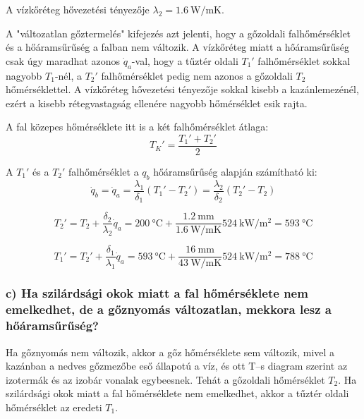 A vízkőréteg hővezetési tényezője $\lambda_2 = \SI{1.6}{\watt\per\meter\kelvin}$.

\vspace{2mm}

A "változatlan gőztermelés" kifejezés azt jelenti, hogy a gőzoldali falhőmérséklet és a hőáramsűrűség a falban nem változik. A vízkőréteg miatt a hőáramsűrűség csak úgy maradhat azonos $\dot{q}_a$-val, hogy a tűztér oldali $T_1'$ falhőmérséklet sokkal nagyobb $T_1$-nél, a $T_2'$ falhőmérséklet pedig nem azonos a gőzoldali $T_2$ hőmérséklettel. A vízkőréteg hővezetési tényezője sokkal kisebb a kazánlemezénél, ezért a kisebb rétegvastagság ellenére nagyobb hőmérséklet esik rajta.

A fal közepes hőmérséklete itt is a két falhőmérséklet átlaga:
\begin{equation}
	T_K' = \frac{T_1' + T_2'}{2}
\end{equation}

A $T_1'$ és a $T_2'$ falhőmérséklet a $q_b$ hőáramsűrűség alapján számítható ki:
\begin{equation}
	\dot{q}_b = \dot{q}_a = \frac{\lambda_1}{\delta_1} (T_1' - T_2') = \frac{\lambda_2}{\delta_2} (T_2' - T_2)
\end{equation}

\begin{equation}
	T_2' = T_2 + \frac{\delta_2}{\lambda_2}\dot{q}_a = \SI{200}{\celsius} + \frac{\SI{1.2}{\milli\meter}}{\SI{1.6}{\watt\per\meter\kelvin}} \SI{524}{\kilo\watt\per\meter\squared} = \SI{593}{\celsius}
\end{equation}

\begin{equation}
	T_1' = T_2' + \frac{\delta_1}{\lambda_1}\dot{q}_a = \SI{593}{\celsius} + \frac{\SI{16}{\milli\meter}}{\SI{43}{\watt\per\meter\kelvin}} \SI{524}{\kilo\watt\per\meter\squared} = \SI{788}{\celsius}
\end{equation}

\subsubsection*{c) Ha szilárdsági okok miatt a fal hőmérséklete nem emelkedhet, de a gőznyomás változatlan, mekkora lesz a hőáramsűrűség?}

Ha gőznyomás nem változik, akkor a gőz hőmérséklete sem változik, mivel a kazánban a nedves gőzmezőbe eső állapotú a víz, és ott T--s diagram szerint az izotermák és az izobár vonalak egybeesnek. Tehát a gőzoldali hőmérséklet $T_2$. Ha szilárdsági okok miatt a fal hőmérséklete nem emelkedhet, akkor a tűztér oldali hőmérséklet az eredeti $T_1$.


